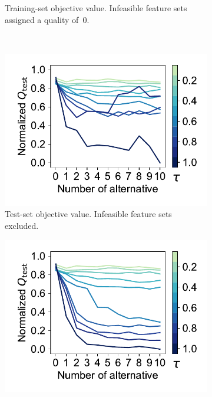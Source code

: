 \documentclass{article}
\theoremstyle{definition}
\begin{document}
\begin{figure}[p]
\begin{subfigure}[t]{0.48\textwidth}
{			Training-set objective value.
			Infeasible feature sets assigned a quality of~0.
		}
		\label{fig:afs:impact-num-alternatives-tau-train-objective-max-fillna}
	\end{subfigure}
	\\ \vspace{\baselineskip}
	\begin{subfigure}[t]{0.48\textwidth}
		\centering
		\includegraphics[width=\textwidth, trim=15 17 10 15, clip]{plots/afs-impact-num-alternatives-tau-test-objective-max.pdf}
		\caption{
			Test-set objective value.
			Infeasible feature sets excluded.
		}
		\label{fig:afs:impact-num-alternatives-tau-test-objective-max}
	\end{subfigure}
	\hfill
	\begin{subfigure}[t]{0.48\textwidth}
		\centering
		\includegraphics[width=\textwidth, trim=15 17 10 15, clip]{plots/afs-impact-num-alternatives-tau-test-objective-max-fillna.pdf}

\end{subfigure}
\end{figure}
\end{document}
